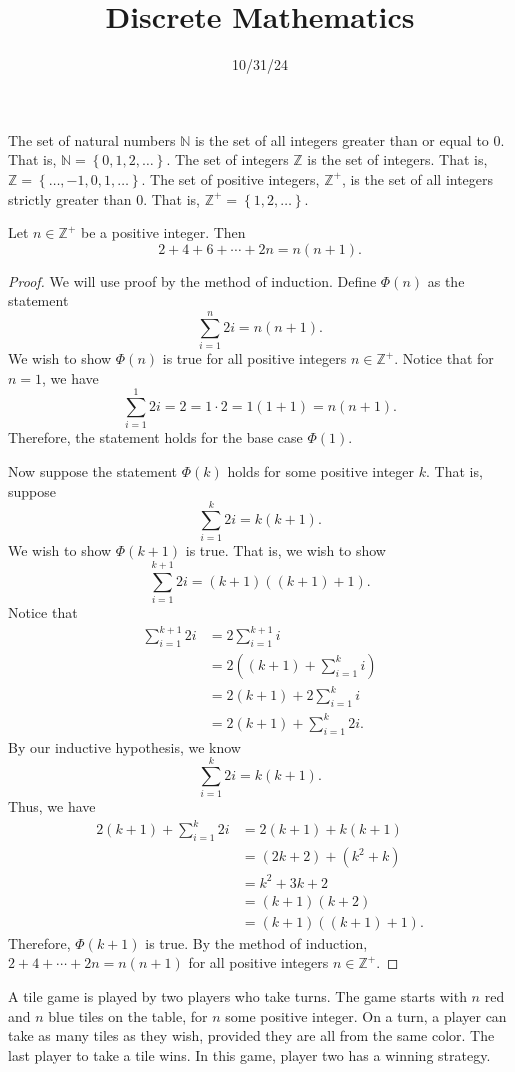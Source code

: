 \documentclass[11pt, letterpaper]{report}
\title{Discrete Mathematics}
\date{10/31/24}
\begin{document}
\makeproblem
\begin{notation}
	The set of natural numbers $\mathbb{N}$ is the set of all integers greater than or equal to $0$. That is, $\mathbb{N}=\left\{ 0,1,2,\ldots \right\} $. The set of integers $\mathbb{Z}$ is the set of integers. That is, $\mathbb{Z}=\left\{ \ldots,-1,0,1,\ldots \right\} $. The set of positive integers, $\mathbb{Z}^+$, is the set of all integers strictly greater than $0$. That is, $\mathbb{Z}^+=\left\{ 1,2,\ldots \right\} $.
\end{notation}
\begin{theorem}\label{thm:1}
	Let $n\in\mathbb{Z}^+$ be a positive integer. Then
	\[
		2+4+6+\cdots+2n=n(n+1)
	.\]
\end{theorem}
\begin{proof}
	We will use proof by the method of induction. Define $\Phi (n)$ as the statement
	\[
		\sum_{i=1}^{n} 2i=n(n+1)
	.\]
	We wish to show $\Phi (n)$ is true for all positive integers $n\in\mathbb{Z}^+$. Notice that for $n=1$, we have
	\[
		\sum_{i=1}^{1} 2i=2=1\cdot 2=1(1+1)=n(n+1)
	.\]
	Therefore, the statement holds for the base case $\Phi (1)$.

	Now suppose the statement $\Phi (k)$ holds for some positive integer $k$. That is, suppose
	\[
		\sum_{i=1}^{k} 2i=k(k+1)
	.\]
	We wish to show $\Phi (k+1)$ is true. That is, we wish to show
	\[
		\sum_{i=1}^{k+1} 2i=(k+1)((k+1)+1)
	.\]
	Notice that
	\begin{align*}
		\sum_{i=1}^{k+1} 2i&=2 \sum_{i=1}^{k+1} i\\
				   &= 2\left( (k+1)+\sum_{i=1}^{k} i \right) \\
				   &=2(k+1)+2 \sum_{i=1}^{k} i\\
				   &=2(k+1)+\sum_{i=1}^{k} 2i
	.\end{align*}
	By our inductive hypothesis, we know
	\[
		\sum_{i=1}^{k} 2i=k(k+1)
	.\]
	Thus, we have
	\begin{align*}
		2(k+1)+\sum_{i=1}^{k} 2i&=2(k+1)+k(k+1)\\
					&=(2k+2)+\left( k^2+k \right) \\
					&=k^2+3k+2\\
					&=(k+1)(k+2)\\
					&=(k+1)((k+1)+1)
	.\end{align*}
	Therefore, $\Phi (k+1)$ is true. By the method of induction, $2+4+\cdots+2n=n(n+1)$ for all positive integers $n\in\mathbb{Z}^+$.
\end{proof}
\begin{theorem}\label{thm:2}
	A tile game is played by two players who take turns. The game starts with $n$ red and $n$ blue tiles on the table, for $n$ some positive integer. On a turn, a player can take as many tiles as they wish, provided they are all from the same color. The last player to take a tile wins. In this game, player two has a winning strategy.
\end{theorem}
\end{document}
